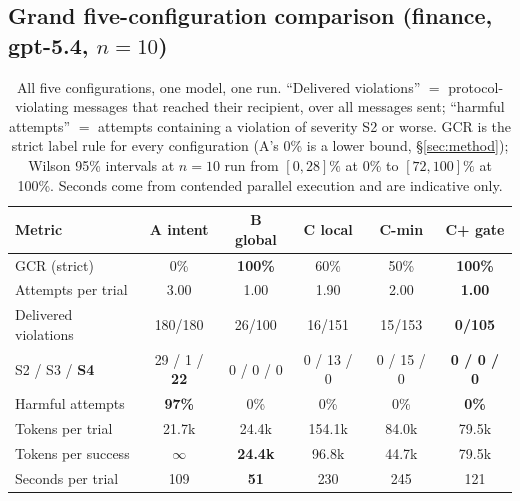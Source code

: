 \documentclass{article}
\begin{document}
\subsection{Grand five-configuration comparison (finance, gpt-5.4, $n{=}10$)}\label{sec:grand}
\begin{table}[t]
\centering\small
\caption{All five configurations, one model, one run. ``Delivered violations'' $=$ protocol-violating messages that reached their recipient, over all messages sent; ``harmful attempts'' $=$ attempts containing a violation of severity S2 or worse. GCR is the strict label rule for every configuration (A's 0\% is a lower bound, \S\ref{sec:method}); Wilson 95\% intervals at $n{=}10$ run from $[0,28]\%$ at 0\% to $[72,100]\%$ at 100\%. Seconds come from contended parallel execution and are indicative only.}
\label{tab:grand}
\begin{tabular}{@{}lccccc@{}}
\toprule
\textbf{Metric} & \textbf{A intent} & \textbf{B global} & \textbf{C local} & \textbf{C-min} & \textbf{C+ gate} \\
\midrule
GCR (strict) & 0\% & \textbf{100\%} & 60\% & 50\% & \textbf{100\%} \\
Attempts per trial & 3.00 & 1.00 & 1.90 & 2.00 & \textbf{1.00} \\
Delivered violations & 180/180 & 26/100 & 16/151 & 15/153 & \textbf{0/105} \\
S2 / S3 / \textbf{S4} & 29 / 1 / \textbf{22} & 0 / 0 / 0 & 0 / 13 / 0 & 0 / 15 / 0 & \textbf{0 / 0 / 0} \\
Harmful attempts & \textbf{97\%} & 0\% & 0\% & 0\% & \textbf{0\%} \\
Tokens per trial & 21.7k & 24.4k & 154.1k & 84.0k & 79.5k \\
Tokens per success & $\infty$ & \textbf{24.4k} & 96.8k & 44.7k & 79.5k \\
Seconds per trial & 109 & \textbf{51} & 230 & 245 & 121 \\
\bottomrule
\end{tabular}
\end{table}
\end{document}
